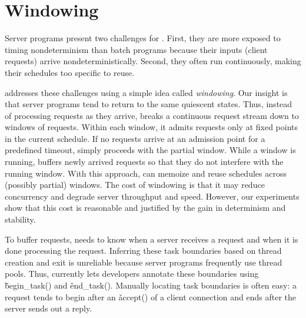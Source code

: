 \vspace{.1in}
\section{Windowing} \label{sec:window}

Server programs present two challenges for \tern.  First, they 
are more exposed to
timing nondeterminism than batch programs because their inputs
(client requests) arrive nondeterministically.  Second, they often run
continuously, making their schedules too specific to reuse.


\tern addresses these challenges using a simple idea called
\emph{windowing}.  Our insight is that server programs tend to return to the
same quiescent states.  Thus, instead of processing requests as they
arrive, \tern breaks a continuous request stream down to windows of
requests.  Within each window, it admits requests only at fixed points in
the current schedule.  If no requests arrive at an admission point for a
predefined timeout, \tern simply proceeds with the partial window.  While a
window is running, \tern buffers newly arrived requests so that they do not
interfere with the running window.  With this approach, \tern can memoize
and reuse schedules across (possibly partial) windows.
The cost of windowing is that it may reduce concurrency
and degrade server throughput and speed.  However, our experiments show
that this cost is reasonable and justified by the gain in determinism
and stability.

To buffer requests, \tern needs to know when a server receives a request
and when it is done processing the request.  Inferring these task
boundaries based on thread creation and exit is unreliable because server
programs frequently use thread pools.  Thus, \tern currently lets
developers annotate these boundaries using \v{begin\_task()} and
\v{end\_task()}.  Manually locating task boundaries is often easy: a
request tends to begin after an \v{accept()} of a client connection and ends
after the server sends out a reply.

